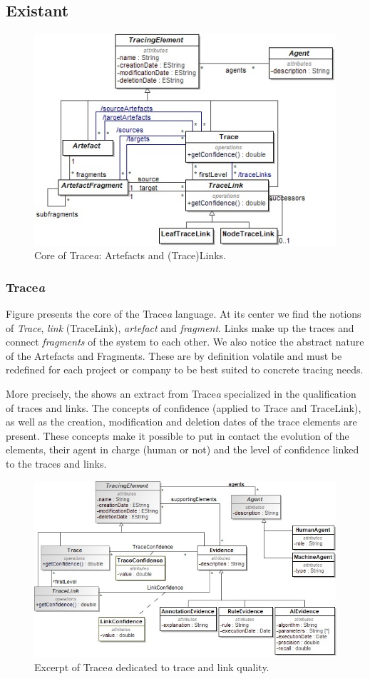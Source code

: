 \subsection{Existant}
\begin{figure}[ht]     
	\centering
	\includegraphics[width=.7\linewidth]{images/core.jpg}
	\caption{Core of Trace\textit{a}: Artefacts and (Trace)Links.}
	\label{fig:mm-core}
\end{figure}
\subsubsection{Trace\textit{a}}


Figure  presents the core of the Trace\textit{a} language. At its center we find the notions of \textit{Trace}, \textit{link} (TraceLink), \textit{artefact} and \textit{fragment}. Links make up the traces and connect \textit{fragments} of the system to each other. We also notice the abstract nature of the Artefacts and Fragments. These are by definition volatile and must be redefined for each project or company to be best suited to concrete tracing needs.

More precisely, the  shows an extract from Trace\textit{a} specialized in the qualification of traces and links. The concepts of confidence (applied to Trace and TraceLink), as well as the creation, modification and deletion dates of the trace elements are present. These concepts make it possible to put in contact the evolution of the elements, their agent in charge (human or not) and the level of confidence linked to the traces and links. 

\begin{figure}[h]     
	\centering
	\includegraphics[width=.8\linewidth]{images/explainability.jpg}
	\caption{Excerpt of Trace\textit{a} dedicated to trace and link quality.}
	\label{fig:mm-explainability}
\end{figure}


